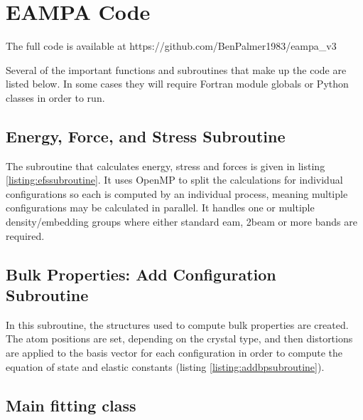 \chapter{EAMPA Code}
\label{chapter:appendix-eampa}
 
The full code is available at https://github.com/BenPalmer1983/eampa\_v3

Several of the important functions and subroutines that make up the code are listed below.  In some cases they will require Fortran module globals or Python classes in order to run.



\section{Energy, Force, and Stress Subroutine}
\label{section:appendixenergyforcestress}

The subroutine that calculates energy, stress and forces is given in listing \ref{listing:efssubroutine}.  It uses OpenMP to split the calculations for individual configurations so each is computed by an individual process, meaning multiple configurations may be calculated in parallel.  It handles one or multiple density/embedding groups where either standard \acrshort{eam}, \acrshort{2beam} or more bands are required.




\section{Bulk Properties: Add Configuration Subroutine}
\label{section:appendixbpaddconfiguration}

In this subroutine, the structures used to compute bulk properties are created.  The atom positions are set, depending on the crystal type, and then distortions are applied to the basis vector for each configuration in order to compute the equation of state and elastic constants (listing \ref{listing:addbpsubroutine}).




\section{Main fitting class}

